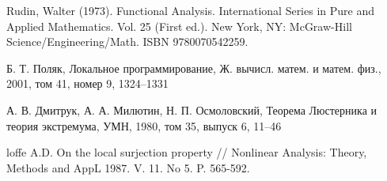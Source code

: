 \documentclass[../main.tex]{subfiles}
\begin{document}
\begin{thebibliography}{99}
Rudin, Walter (1973). Functional Analysis. International Series in Pure and Applied Mathematics. Vol. 25 (First ed.). New York, NY: McGraw-Hill Science/Engineering/Math. ISBN 9780070542259.

Б. Т. Поляк, Локальное программирование, Ж. вычисл. матем. и матем. физ., 2001, том 41, номер 9, 1324–1331

А. В. Дмитрук, А. А. Милютин, Н. П. Осмоловский, Теорема Люстерника и теория экстремума, УМН, 1980, том 35, выпуск 6, 11–46

loffe A.D. On the local surjection property // Nonlinear Analysis: Theory, Methods and AppL 1987. V. 11. No 5. P. 565-592.













\end{thebibliography}
\end{document}

